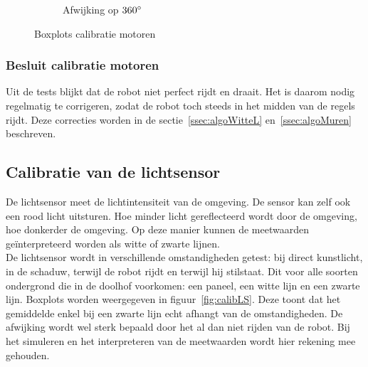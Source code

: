 \documentclass[eind]{penoverslag}
\begin{document}
\begin{figure}
\begin{subfigure}[h]{0.32\textwidth}
                \caption{Afwijking op $360 \degree$}
        \end{subfigure}
 \caption{Boxplots calibratie motoren}
\label{fig:calibM}
\end{figure}

\subsubsection{Besluit calibratie motoren} %
\label{ssec:calibMbesluit}
Uit de tests blijkt dat de robot niet perfect rijdt en draait. Het is daarom nodig regelmatig te corrigeren, zodat de robot toch steeds in het midden van de regels rijdt. Deze correcties worden in de sectie~\ref{ssec:algoWitteL} en~\ref{ssec:algoMuren} beschreven.


\subsection{Calibratie van de lichtsensor} %
\label{ssec:calibLS}
De lichtsensor meet de lichtintensiteit van de omgeving. De sensor kan zelf ook een rood licht uitsturen. Hoe minder licht gereflecteerd wordt door de omgeving, hoe donkerder de omgeving. Op deze manier kunnen de meetwaarden ge\"interpreteerd worden als witte of zwarte lijnen.\\
De lichtsensor wordt in verschillende omstandigheden getest: bij direct kunstlicht, in de schaduw, terwijl de robot rijdt en terwijl hij stilstaat. Dit voor alle soorten ondergrond die in de doolhof voorkomen: een paneel, een witte lijn en een zwarte lijn. Boxplots worden weergegeven in figuur~\ref{fig:calibLS}. Deze toont dat het gemiddelde enkel bij een zwarte lijn echt afhangt van de omstandigheden. De afwijking wordt wel sterk bepaald door het al dan niet rijden van de robot. Bij het simuleren en het interpreteren van de meetwaarden wordt hier rekening mee gehouden.
\end{document}
